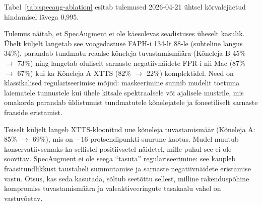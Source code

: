 Tabel~\ref{tab:specaug-ablation} esitab tulemused 2026-04-21 ühtsel kõrvalejäetud hindamisel lävega 0,995.

\begin{table}[H]
\centering
\caption{SpecAugmenti mõju võrdlus: v13a (SA OFF) ja v13b (SA ON), lävi\,=\,0,995. Andmestik ja arhitektuur on identsed; tuvastusveerud mõõdavad Kõneleja~A XTTS ($N=48$) ja Kõneleja~B ($N=11$) kõrvalejäetud klippide tuvastamismäära (\%); veerudefinitsioonid samad mis tabelis~\ref{tab:residual-ablation}.}
\label{tab:specaug-ablation}
\scriptsize
{}
\end{table}

Tulemus näitab, et SpecAugment ei ole käesolevas seadistuses üheselt kasulik. Ühelt küljelt langetab see voogedastuse FAPH-i 134-lt 88-le (suhteline langus 34\%), parandab tundmatu reaalse kõneleja tuvastamismäära (Kõneleja B 45\% $\rightarrow$ 73\%) ning langetab oluliselt sarnaste negatiivnäidete FPR-i nii Mac (87\% $\rightarrow$ 67\%) kui ka Kõneleja A XTTS (82\% $\rightarrow$ 22\%) komplektidel. Need on klassikalised regulariseerimise mõjud: maskeerimine sunnib mudelit toetuma laiematele tunnustele kui ühele kitsale spektraalsele või ajalisele mustrile, mis omakorda parandab üldistumist tundmatutele kõnelejatele ja foneetiliselt sarnaste fraaside eristamist.

Teiselt küljelt langeb XTTS-kloonitud uue kõneleja tuvastamismäär (Kõneleja A: 85\% $\rightarrow$ 69\%), mis on $-16$ protsendipunkti suurune kaotus. Mudel muutub konservatiivsemaks ka sellistel positiivsetel näidetel, mille puhul see ei ole soovitav. SpecAugment ei ole seega \enquote{tasuta} regulariseerimine: see kaupleb fraasitundlikkust taustaheli summutamise ja sarnaste negatiivnäidete eristamise vastu. Otsus, kas seda kasutada, sõltub seetõttu sellest, milline rakenduspõhine kompromiss tuvastamismäära ja valeaktiveeringute tasakaalu vahel on vastuvõetav.

